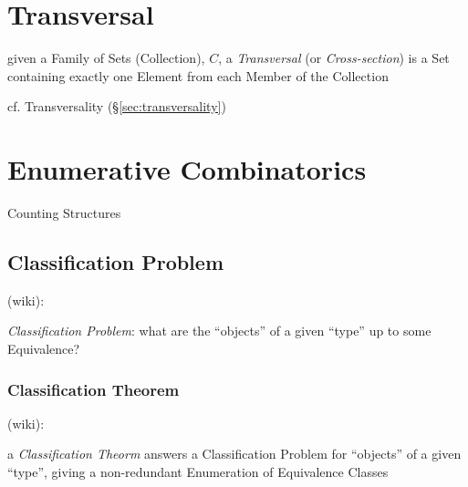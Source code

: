 \section{Transversal}\label{sec:transversal}

given a Family of Sets (Collection), $C$, a \emph{Transversal} (or
\emph{Cross-section}) is a Set containing exactly one Element from each Member
of the Collection

cf. Transversality (\S\ref{sec:transversality})



\section{Enumerative Combinatorics}\label{sec:enumerative_combinatorics}

Counting Structures



\subsection{Classification Problem}\label{sec:classification_problem}

(wiki):

\emph{Classification Problem}: what are the ``objects'' of a given ``type'' up
to some Equivalence?



\subsubsection{Classification Theorem}\label{sec:classification_theorem}

(wiki):

a \emph{Classification Theorm} answers a Classification Problem for ``objects''
of a given ``type'', giving a non-redundant Enumeration of Equivalence Classes

